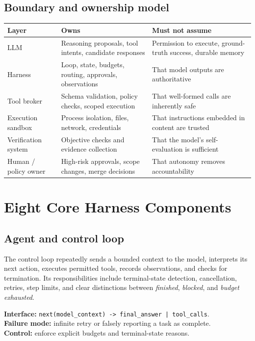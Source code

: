 \documentclass[10pt,letterpaper]{article}
\newcommand{\code}[1]{\texttt{#1}}
\begin{document}
\subsection{Boundary and ownership model}
\begin{tabularx}{\textwidth}{L{2.75cm} Y Y}
\toprule
\textbf{Layer} & \textbf{Owns} & \textbf{Must not assume} \\
\midrule
LLM & Reasoning proposals, tool intents, candidate responses & Permission to execute, ground-truth success, durable memory \\
Harness & Loop, state, budgets, routing, approvals, observations & That model outputs are authoritative \\
Tool broker & Schema validation, policy checks, scoped execution & That well-formed calls are inherently safe \\
Execution sandbox & Process isolation, files, network, credentials & That instructions embedded in content are trusted \\
Verification system & Objective checks and evidence collection & That the model's self-evaluation is sufficient \\
Human / policy owner & High-risk approvals, scope changes, merge decisions & That autonomy removes accountability \\
\bottomrule
\end{tabularx}

\section{Eight Core Harness Components}\label{sec:components}
\subsection{Agent and control loop}
The control loop repeatedly sends a bounded context to the model, interprets its next action, executes permitted tools, records observations, and checks for termination. Its responsibilities include terminal-state detection, cancellation, retries, step limits, and clear distinctions between \emph{finished}, \emph{blocked}, and \emph{budget exhausted}.

\textbf{Interface:} \code{next(model\_context) -> final\_answer | tool\_calls}.\\
\textbf{Failure mode:} infinite retry or falsely reporting a task as complete.\\
\textbf{Control:} enforce explicit budgets and terminal-state reasons.
\end{document}
